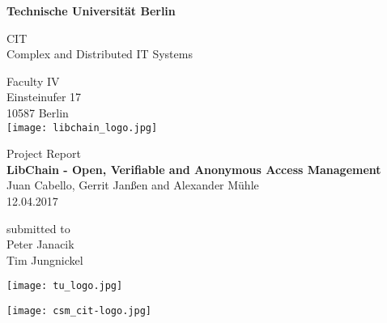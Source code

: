 \thispagestyle{empty}
\begin{center}
{\LARGE \textbf{Technische Universität Berlin}}

\vspace{0.5cm}

{\large CIT\\[1mm]}
{\large Complex and Distributed IT Systems\\[5mm]}

Faculty IV\\
Einsteinufer 17\\
10587 Berlin\\

\vspace*{1cm}
\texttt{[image: libchain\_logo.jpg]}
\vspace{0.6cm}

{\LARGE Project Report}\\
\vspace{0.3cm}
{\LARGE \textbf{LibChain - Open, Verifiable and Anonymous Access Management}}\\
\vspace*{1.0cm}
{ Juan Cabello, Gerrit Janßen and Alexander Mühle}
\\
\vspace*{0.5cm}
12.04.2017\\ %
\vspace*{0.5cm}

{\small submitted to}\\
Peter Janacik\\
Tim Jungnickel\\
\vspace{1.5cm}
\begin{minipage}[t]{0.33\textwidth} 
\begin{center}
\texttt{[image: tu\_logo.jpg]} 
\end{center}

\end{minipage} 
\begin{minipage}[t]{0.33\textwidth} %
\end{minipage} 
\begin{minipage}[t]{0.4\textwidth} 
\begin{center}
\texttt{[image: csm\_cit-logo.jpg]} 
\end{center}
\end{minipage}



\end{center}


